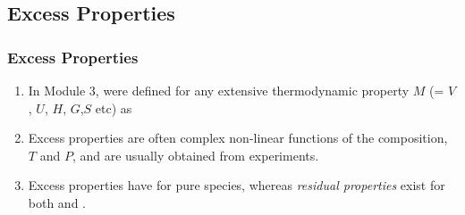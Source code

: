 \documentclass[10pt,compress,handout,ignorenonframetext,unknownkeysallowed]{beamer}
\begin{document}
\subsection{Excess Properties}

\begin{frame}
  \frametitle{Excess Properties}
  \begin{enumerate}%
      \item<1-> In Module 3,  were defined for any extensive thermodynamic property $M$ (= $V$, $U$, $H$, $G$,$S$ etc) as
      \item<2-> Excess properties are often complex non-linear functions of the composition, $T$ and $P$, and are usually obtained from experiments.
      \item<3-> Excess properties have  for pure species, whereas {\it residual properties} exist for both  and .
  \end{enumerate}
\end{frame}
\normalsize
\end{document}

